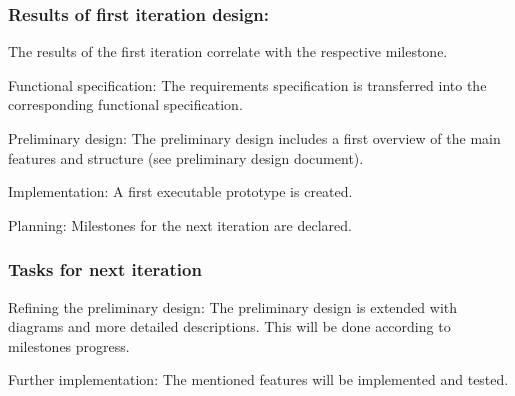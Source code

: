 \subsubsection{Results of first iteration design:}
The results of the first iteration correlate with the respective milestone. 
\begin{aims}
		\item[Functional specification:] The requirements specification is transferred into the corresponding functional specification.
		
	    \item[Preliminary design:] The preliminary design includes a first overview of the main features and structure (see preliminary design document).
		\item[Implementation:] A first executable prototype is created.
		
		\item[Planning:] Milestones for the next iteration are declared.
				
	\end{aims}

\subsubsection{Tasks for next iteration}

\begin{aims}
	\item[Refining the preliminary design:] The preliminary design is extended with diagrams and more detailed descriptions. This will be done according to milestones progress.
		
		\item[Further implementation:] The mentioned features will be implemented and tested.
	
\end{aims}
